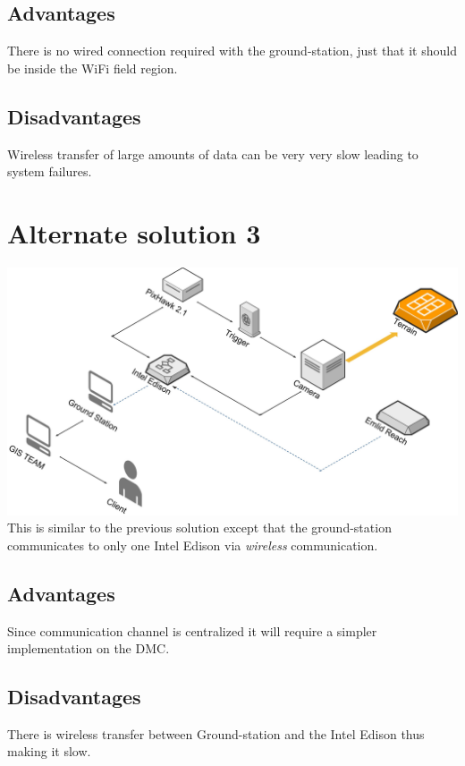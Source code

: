 \documentclass[12pt]{report}
\begin{document}
\subsection{Advantages}
There is no wired connection required with the ground-station, just that it should be inside the WiFi field region.
\subsection{Disadvantages} 
 Wireless transfer of large amounts of data can be very very slow leading to system failures.
 
\section{Alternate solution 3}
 \includegraphics[width=\linewidth]{Alternative_Solution3.jpg} 
  \\ 
 This is similar to the previous solution except that the ground-station communicates to only one Intel Edison via \emph{wireless} communication.
\subsection{Advantages}
Since communication channel is centralized it will require a simpler implementation on the DMC.
\subsection{Disadvantages} 
  There is wireless transfer between Ground-station and the Intel Edison thus  making it slow.
\end{document}
